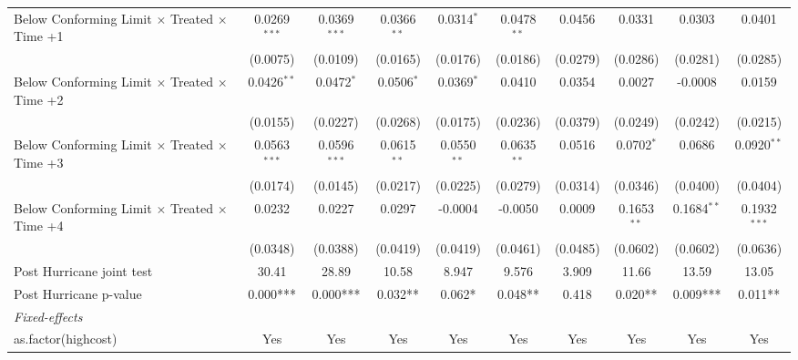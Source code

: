 \begin{tabular}{lccccccccc}
   Below Conforming Limit $\times$ Treated $\times$ Time +1   & 0.0269$^{***}$ & 0.0369$^{***}$ & 0.0366$^{**}$ & 0.0314$^{*}$  & 0.0478$^{**}$  & 0.0456       & 0.0331        & 0.0303        & 0.0401\\   
                                                              & (0.0075)       & (0.0109)       & (0.0165)      & (0.0176)      & (0.0186)       & (0.0279)     & (0.0286)      & (0.0281)      & (0.0285)\\   
   Below Conforming Limit $\times$ Treated $\times$ Time +2   & 0.0426$^{**}$  & 0.0472$^{*}$   & 0.0506$^{*}$  & 0.0369$^{*}$  & 0.0410         & 0.0354       & 0.0027        & -0.0008       & 0.0159\\   
                                                              & (0.0155)       & (0.0227)       & (0.0268)      & (0.0175)      & (0.0236)       & (0.0379)     & (0.0249)      & (0.0242)      & (0.0215)\\   
   Below Conforming Limit $\times$ Treated $\times$ Time +3   & 0.0563$^{***}$ & 0.0596$^{***}$ & 0.0615$^{**}$ & 0.0550$^{**}$ & 0.0635$^{**}$  & 0.0516       & 0.0702$^{*}$  & 0.0686        & 0.0920$^{**}$\\   
                                                              & (0.0174)       & (0.0145)       & (0.0217)      & (0.0225)      & (0.0279)       & (0.0314)     & (0.0346)      & (0.0400)      & (0.0404)\\   
   Below Conforming Limit $\times$ Treated $\times$ Time +4   & 0.0232         & 0.0227         & 0.0297        & -0.0004       & -0.0050        & 0.0009       & 0.1653$^{**}$ & 0.1684$^{**}$ & 0.1932$^{***}$\\   
                                                              & (0.0348)       & (0.0388)       & (0.0419)      & (0.0419)      & (0.0461)       & (0.0485)     & (0.0602)      & (0.0602)      & (0.0636)\\   
   Post Hurricane joint test                                  & 30.41          & 28.89          & 10.58         & 8.947         & 9.576          & 3.909        & 11.66         & 13.59         & 13.05\\  
   Post Hurricane p-value                                     & 0.000***       & 0.000***       & 0.032**       & 0.062*        & 0.048**        & 0.418        & 0.020**       & 0.009***      & 0.011**\\  
   \midrule
   \emph{Fixed-effects}\\
   as.factor(highcost)                                        & Yes            & Yes            & Yes           & Yes           & Yes            & Yes          & Yes           & Yes           & Yes\\  

\end{tabular}
